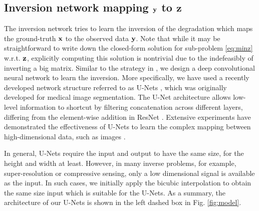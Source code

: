 \documentclass[10pt,twocolumn,letterpaper]{article}
\begin{document}
\subsection{Inversion network mapping ${\mathbf{y}}$ to $\mathbf{z}$}
The inversion network tries to learn the inversion of the degradation which maps the ground-truth ${\mathbf{x}}$ to the observed data ${\mathbf{y}}$. 
Note that while it may be straightforward to write down the closed-form solution for sub-problem \ref{eq:minz} w.r.t. ${\mathbf{z}}$, explicitly computing this solution is nontrivial due to the indefeasibly of inverting a big matrix. 
Similar to the strategy in \cite{ADMM2017NIPS,sonderby2016amortised}, we design a deep convolutional neural network to learn the inversion. 
More specifically, we have used a recently developed network structure referred to as U-Nets \cite{ronneberger2015u}, which was originally developed for medical image segmentation. 
The U-Net architecture allows low-level information to shortcut by filtering concatenation across different layers, differing from the element-wise addition in ResNet \cite{He_2016_CVPR}. 
Extensive experiments have demonstrated the effectiveness of U-Nets to learn the complex mapping between high-dimensional data, such as images \cite{cciccek20163d,Jin2017}. 

In general, U-Nets require the input and output to have the same size, for the height and width at least. 
However, in many inverse problems, for example, super-resolution or compressive sensing, only a low dimensional signal 
is available as the input. %
In such cases, we initially apply the bicubic interpolation to obtain the same size input which is suitable for the U-Nets. 
As a summary, the architecture of our U-Nets is shown in the left dashed box in Fig. \ref{fig:model}. 
\end{document}
